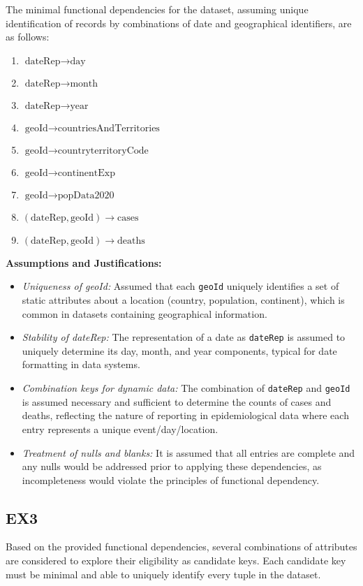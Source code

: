 \documentclass{article}
\begin{document}
The minimal functional dependencies for the dataset, assuming unique identification of records by combinations of date and geographical identifiers, are as follows:
\begin{enumerate}
    \item \( \text{dateRep} \rightarrow \text{day} \)
    \item \( \text{dateRep} \rightarrow \text{month} \)
    \item \( \text{dateRep} \rightarrow \text{year} \)
    \item \( \text{geoId} \rightarrow \text{countriesAndTerritories} \)
    \item \( \text{geoId} \rightarrow \text{countryterritoryCode} \)
    \item \( \text{geoId} \rightarrow \text{continentExp} \)
    \item \( \text{geoId} \rightarrow \text{popData2020} \)
    \item \( (\text{dateRep}, \text{geoId}) \rightarrow \text{cases} \)
    \item \( (\text{dateRep}, \text{geoId}) \rightarrow \text{deaths} \)
\end{enumerate}
\newpage

\textbf{Assumptions and Justifications:}
\begin{itemize}
    \item \textit{Uniqueness of geoId:} Assumed that each \texttt{geoId} uniquely identifies a set of static attributes about a location (country, population, continent), which is common in datasets containing geographical information.
    \item \textit{Stability of dateRep:} The representation of a date as \texttt{dateRep} is assumed to uniquely determine its day, month, and year components, typical for date formatting in data systems.
    \item \textit{Combination keys for dynamic data:} The combination of \texttt{dateRep} and \texttt{geoId} is assumed necessary and sufficient to determine the counts of cases and deaths, reflecting the nature of reporting in epidemiological data where each entry represents a unique event/day/location.
    \item \textit{Treatment of nulls and blanks:} It is assumed that all entries are complete and any nulls would be addressed prior to applying these dependencies, as incompleteness would violate the principles of functional dependency.
\end{itemize}


\subsection{EX3}
Based on the provided functional dependencies, several combinations of attributes are considered to explore their eligibility as candidate keys. Each candidate key must be minimal and able to uniquely identify every tuple in the dataset.
\end{document}
